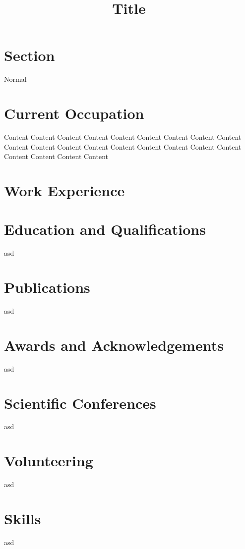 \documentclass[a4paper,10pt]{article}
\begin{document}
\pagestyle{style1}

\title{Title}

\section{Section}



Normal

\clearpage

\pagestyle{style2}

\section{Current Occupation}

Content Content Content Content Content Content Content Content Content Content Content Content Content Content Content Content Content Content Content Content Content Content

\section{Work Experience}


\section{Education and Qualifications}

asd

\section{Publications}

asd

\section{Awards and Acknowledgements}

asd

\section{Scientific Conferences}

asd

\section{Volunteering}

asd

\section{Skills}

asd
\end{document}
